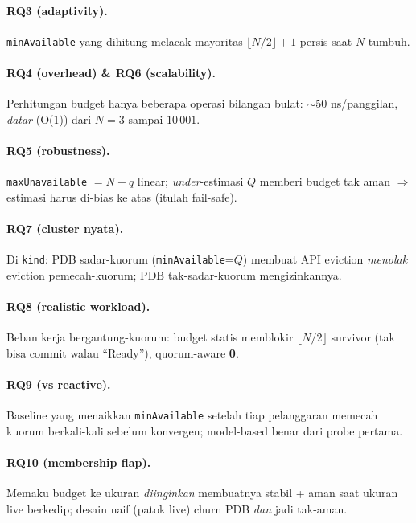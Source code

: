 \documentclass[11pt]{article}
\newcommand{\code}[1]{\texttt{\small #1}}
\begin{document}
\paragraph{RQ3 (adaptivity).} \code{minAvailable} yang dihitung melacak mayoritas $\lfloor N/2\rfloor+1$
persis saat $N$ tumbuh.
\paragraph{RQ4 (overhead) \& RQ6 (scalability).} Perhitungan budget hanya beberapa operasi bilangan
bulat: $\sim$50 ns/panggilan, \emph{datar} (O(1)) dari $N=3$ sampai $10\,001$.
\paragraph{RQ5 (robustness).} \code{maxUnavailable} $=N-q$ linear; \emph{under}-estimasi $Q$ memberi
budget tak aman $\Rightarrow$ estimasi harus di-bias ke atas (itulah fail-safe).
\paragraph{RQ7 (cluster nyata).} Di \code{kind}: PDB sadar-kuorum (\code{minAvailable}=$Q$) membuat API
eviction \emph{menolak} eviction pemecah-kuorum; PDB tak-sadar-kuorum mengizinkannya.
\paragraph{RQ8 (realistic workload).} Beban kerja bergantung-kuorum: budget statis memblokir
$\lfloor N/2\rfloor$ survivor (tak bisa commit walau ``Ready''), quorum-aware \textbf{0}.
\paragraph{RQ9 (vs reactive).} Baseline yang menaikkan \code{minAvailable} setelah tiap pelanggaran
memecah kuorum berkali-kali sebelum konvergen; model-based benar dari probe pertama.
\paragraph{RQ10 (membership flap).} Memaku budget ke ukuran \emph{diinginkan} membuatnya stabil + aman
saat ukuran live berkedip; desain naif (patok live) churn PDB \emph{dan} jadi tak-aman.
\end{document}
